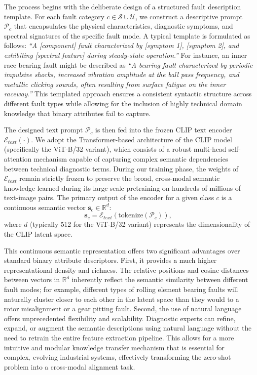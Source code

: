 \documentclass[journal]{IEEEtran}
\begin{document}
The process begins with the deliberate design of a structured fault description template. For each fault category $c \in \mathcal{S} \cup \mathcal{U}$, we construct a descriptive prompt $\mathcal{P}_c$ that encapsulates the physical characteristics, diagnostic symptoms, and spectral signatures of the specific fault mode. A typical template is formulated as follows: \textit{``A [component] fault characterized by [symptom 1], [symptom 2], and exhibiting [spectral feature] during steady-state operation.''} For instance, an inner race bearing fault might be described as \textit{``A bearing fault characterized by periodic impulsive shocks, increased vibration amplitude at the ball pass frequency, and metallic clicking sounds, often resulting from surface fatigue on the inner raceway.''} This templated approach ensures a consistent syntactic structure across different fault types while allowing for the inclusion of highly technical domain knowledge that binary attributes fail to capture.

The designed text prompt $\mathcal{P}_c$ is then fed into the frozen CLIP text encoder $\mathcal{E}_{text}(\cdot)$. We adopt the Transformer-based architecture of the CLIP model (specifically the ViT-B/32 variant), which consists of a robust multi-head self-attention mechanism capable of capturing complex semantic dependencies between technical diagnostic terms. During our training phase, the weights of $\mathcal{E}_{text}$ remain strictly frozen to preserve the broad, cross-modal semantic knowledge learned during its large-scale pretraining on hundreds of millions of text-image pairs. The primary output of the encoder for a given class $c$ is a continuous semantic vector $\mathbf{s}_c \in \mathbb{R}^d$:
\begin{equation}
    \mathbf{s}_c = \mathcal{E}_{text}(\text{tokenize}(\mathcal{P}_c)),
\end{equation}
where $d$ (typically 512 for the ViT-B/32 variant) represents the dimensionality of the CLIP latent space.

This continuous semantic representation offers two significant advantages over standard binary attribute descriptors. First, it provides a much higher representational density and richness. The relative positions and cosine distances between vectors in $\mathbb{R}^d$ inherently reflect the semantic similarity between different fault modes; for example, different types of rolling element bearing faults will naturally cluster closer to each other in the latent space than they would to a rotor misalignment or a gear pitting fault. Second, the use of natural language offers unprecedented flexibility and scalability. Diagnostic experts can refine, expand, or augment the semantic descriptions using natural language without the need to retrain the entire feature extraction pipeline. This allows for a more intuitive and modular knowledge transfer mechanism that is essential for complex, evolving industrial systems, effectively transforming the zero-shot problem into a cross-modal alignment task.
\end{document}
